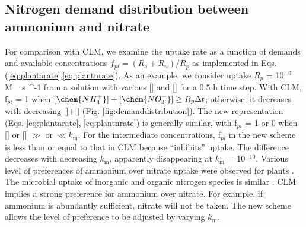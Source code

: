 \documentclass[gmd, manuscript]{copernicus}
\begin{document}
\subsection{Nitrogen demand distribution between ammonium and nitrate}
For comparison with CLM, we examine the uptake rate as a function of demands
and available concentrations 
$f_{pi} = ({R_a + R_n})/{R_p}$ as implemented in Eqs. (\ref{eq:plantarate},\ref{eq:plantnrate}).
As an example, we consider uptake $R_p$ = 10$^{-9}$ \unit{M\,s{^{-1}}} from a
solution with various [] and [] for a 0.5 h time
step. With CLM, f$_{pi}$ = 1 when $[\chem{NH_4^+}]+[\chem{NO_3^-}]\geq
R_p\Delta t$; otherwise, it decreases with decreasing
[]+[] (Fig. \ref{fig:demanddistribution}). The new
representation (Eqs. \ref{eq:plantarate}, \ref{eq:plantnrate}) is generally
similar, with f$_{pi}$ = 1 or 0 when [] or [] $\gg$
or $\ll k_\text{m}$. For the intermediate concentrations, f$_{pi}$ in the new
scheme is less than or equal to that in CLM because  ``inhibits''
 uptake. The difference decreases with decreasing $k_\text{m}$,
apparently disappearing at $k_\text{m}$ = 10$^{-10}$. 
Various level of preferences of ammonium over nitrate uptake were observed for plants
\citep{Pfautsch2009,Warren2007,Nordin2001,Falkengren1995,Gherardi2013}. The
microbial uptake of inorganic and organic nitrogen species is similar
\citep{Fouilland2007,Kirchman1994,Kirchman1998,Middelburg2000,Veuger2004}. CLM
implies a strong preference for ammonium over nitrate. For example, if
ammonium is abundantly sufficient, nitrate will not be taken. The new scheme
allows the level of preference to be adjusted by varying $k_\text{m}$.
\end{document}
